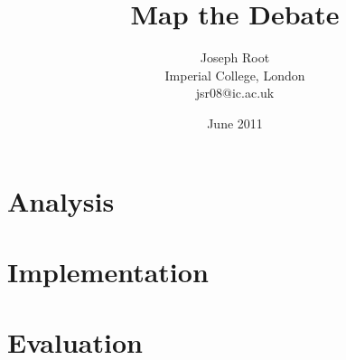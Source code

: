 \documentclass[a4paper,11pt]{report}
\author{Joseph Root\\
Imperial College, London\\
jsr08@ic.ac.uk}
\date{June 2011}
\title{Map the Debate}
\begin{document}
	
	
	
	
	
	
	
	\setcounter{tocdepth}{1}
	\tableofcontents
	
	\part{Analysis}
	
	
	
	

	
	\part{Implementation}

	
	
	

	

	
	
	
	
	
	
	
	
	
	
	\part{Evaluation}
	
\end{document}
